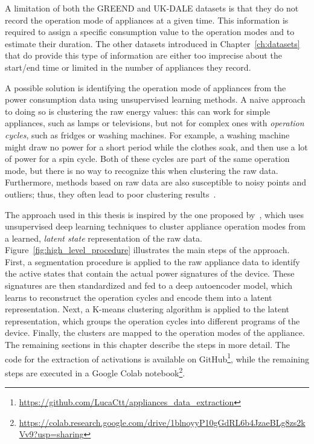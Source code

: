A limitation of both the GREEND and UK-DALE datasets is that they do not record the operation mode of appliances at a given time. This information is required to assign a specific consumption value to the operation modes and to estimate their duration. The other datasets introduced in Chapter~\ref{ch:datasets} that do provide this type of information are either too imprecise about the start/end time or limited in the number of appliances they record.

A possible solution is identifying the operation mode of appliances from the power consumption data using unsupervised learning methods. A naive approach to doing so is clustering the raw energy values: this can work for simple appliances, such as lamps or televisions, but not for complex ones with \textit{operation cycles}, such as fridges or washing machines. For example, a washing machine might draw no power for a short period while the clothes soak, and then use a lot of power for a spin cycle. Both of these cycles are part of the same operation mode, but there is no way to recognize this when clustering the raw data. Furthermore, methods based on raw data are also susceptible to noisy points and outliers; thus, they often lead to poor clustering results~\parencite{castangiaClusteringApplianceOperation2023}.

The approach used in this thesis is inspired by the one proposed by~\textcite{castangiaClusteringApplianceOperation2023}, which uses unsupervised deep learning techniques to cluster appliance operation modes from a learned, \textit{latent state} representation of the raw data. Figure~\ref{fig:high_level_procedure} illustrates the main steps of the approach. First, a segmentation procedure is applied to the raw appliance data to identify the active states that contain the actual power signatures of the device. These signatures are then standardized and fed to a deep autoencoder model, which learns to reconstruct the operation cycles and encode them into a latent representation. Next, a K-means clustering algorithm is applied to the latent representation, which groups the operation cycles into different programs of the device. Finally, the clusters are mapped to the operation modes of the appliance. The remaining sections in this chapter describe the steps in more detail. The code for the extraction of activations is available on GitHub\footnote{\url{https://github.com/LucaCtt/appliances_data_extraction}}, while the remaining steps are executed in a Google Colab notebook\footnote{\url{https://colab.research.google.com/drive/1blnoyyP10gGdRL6b4JzaeBLg8zs2kVv9?usp=sharing}}.

